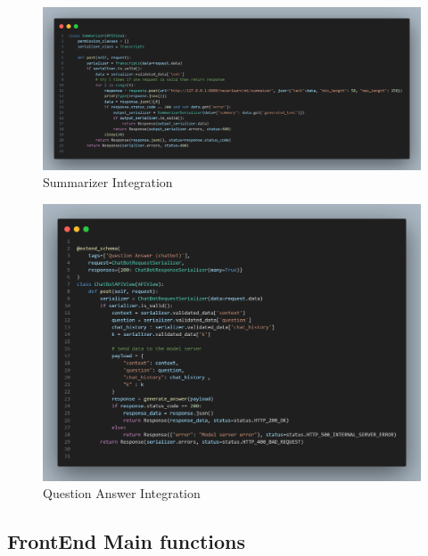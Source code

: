 \begin{figure}[h!]
	\centering
	\includegraphics[max height=\textheight,max width=\textwidth]{figures/srccode/summarizer.png}
	\caption{Summarizer Integration}
\end{figure}

\begin{figure}[h!]
	\centering
	\includegraphics[max height=\textheight,max width=\textwidth]{figures/srccode/Question-answer.png}
	\caption{Question Answer Integration}
\end{figure}

\FloatBarrier
\subsection{FrontEnd Main functions}

